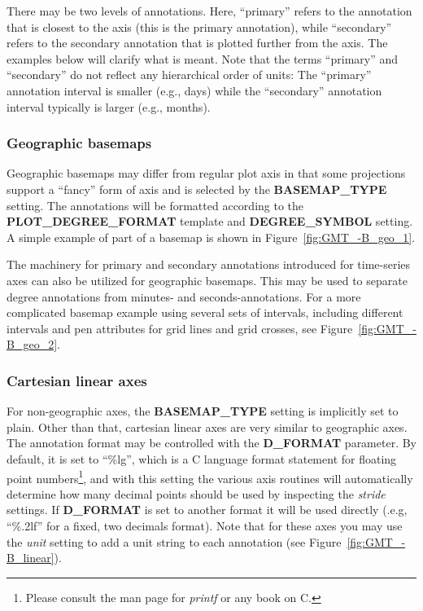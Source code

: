 There may be two levels of annotations.  Here, ``primary'' refers to the annotation
that is closest to the axis (this is the primary annotation), while ``secondary'' refers to the secondary
annotation that is plotted further from the axis.  The examples below
will clarify what is meant.  Note that the terms ``primary'' and ``secondary'' do not reflect any hierarchical
order of units: The ``primary'' annotation interval is smaller (e.g., days) while the
``secondary'' annotation interval typically is larger (e.g., months).

\subsubsection{Geographic basemaps}

Geographic basemaps may differ from regular plot axis in that some projections support a
``fancy'' form of axis and is selected by the {\bf BASEMAP\_TYPE} setting.  The annotations
will be formatted according to the {\bf PLOT\_DEGREE\_FORMAT} template and {\bf DEGREE\_SYMBOL}
setting.  A simple example of part of a basemap is shown in Figure~\ref{fig:GMT_-B_geo_1}.


The machinery for primary and secondary annotations introduced for time-series axes can
also be utilized for geographic basemaps.  This may be used to separate
degree annotations from minutes- and seconds-annotations.  For a more complicated basemap
example using several sets of intervals, including different intervals and pen attributes
for grid lines and grid crosses, see Figure~\ref{fig:GMT_-B_geo_2}.



\subsubsection{Cartesian linear axes}

For non-geographic axes, the {\bf BASEMAP\_TYPE} setting is implicitly set to plain.  Other than that,
cartesian linear axes are very similar to geographic axes.  The annotation format may be controlled with
the {\bf D\_FORMAT} parameter.  By default, it is set to ``\%lg'', which is a C language format statement
for floating point numbers\footnote{Please consult the man page for \emph{printf} or any book on C.},
and with this setting the various axis routines will automatically determine
how many decimal points should be used by inspecting the {\it stride} settings.  If {\bf D\_FORMAT} is set
to another format it will be used directly (.e.g, ``\%.2lf'' for a fixed, two decimals format).
Note that for these axes you may use the {\it unit} setting to
add a unit string to each annotation (see Figure~\ref{fig:GMT_-B_linear}).

